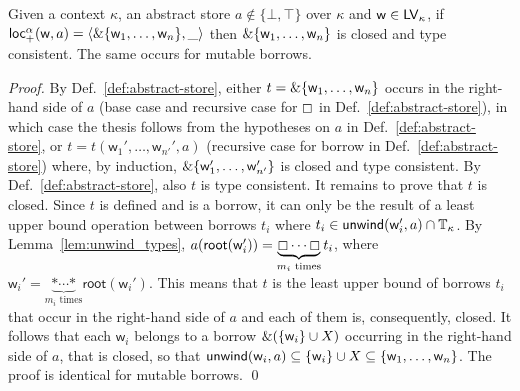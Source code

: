\begin{lemma}\label{lem:consistency}
  Given a context $\kappa$, an abstract store $a\not\in\{\bot,\top\}$ over $\kappa$ and
  $\mathsf{w}\in\mathsf{LV}_\kappa$, if
  $\mathsf{loc_+^\alpha}(\mathsf{w},a)=\langle\&\{\mathsf{w}_1,\ldots,\mathsf{w}_n\},\_\rangle$
  then $\&\{\mathsf{w}_1,\ldots,\mathsf{w}_n\}$ is closed and type consistent.
  The same occurs for mutable borrows.
\end{lemma}
\begin{proof}
  By Def.~\ref{def:abstract-store}, either
  $t=\&\{\mathsf{w}_1,\ldots,\mathsf{w}_n\}$
  occurs in the right-hand side of $a$ (base case and recursive case
  for $\boxempty$ in Def.~\ref{def:abstract-store}), in which case the
  thesis follows from the hypotheses on $a$ in Def.~\ref{def:abstract-store},
  or $t=t(\mathsf{w}_1',\ldots,\mathsf{w}_{n'}',a)$ (recursive case for
  borrow in Def.~\ref{def:abstract-store}) where, by induction,
  $\&\{\mathsf{w}_1',\ldots,\mathsf{w}'_{n'}\}$ is closed and type consistent.
  By Def.~\ref{def:abstract-store}, also $t$ is type consistent.
  It remains to prove that $t$ is closed.
  Since $t$ is defined and is a borrow, it can only be the result of a least upper bound operation
  between borrows $t_i$ where $t_i\in\mathsf{unwind}(\mathsf{w}_i',a)\cap\mathbb{T}_\kappa$.
  By Lemma~\ref{lem:unwind_types},
  $a(\mathsf{root}(\mathsf{w}_i'))=\underbrace{\boxempty\cdots\boxempty}_\text{$m_i$ times}t_i$,
  where $\mathsf{w}_i'=\underbrace{\mathtt{*}\cdots\mathtt{*}}_{\text{$m_i$ times}}\mathsf{root}(\mathsf{w}_i')$.
  This means that $t$ is the least upper bound
  of borrows $t_i$ that occur in the right-hand side of $a$ and each of them is, consequently, closed.
  It follows that each $\mathsf{w}_i$ belongs to a borrow
  $\&(\{\mathsf{w}_i\}\cup X)$ occurring in the right-hand side of $a$,
  that is closed, so that $\mathsf{unwind}(\mathsf{w}_i,a)\subseteq\{\mathsf{w}_i\}\cup X\subseteq\{\mathsf{w}_1,\dots,\mathsf{w}_n\}$.
  The proof is identical for mutable borrows.
  \qed
\end{proof}

